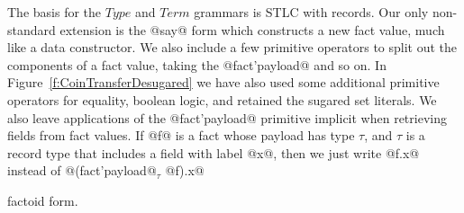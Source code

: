 The basis for the $Type$ and $Term$ grammars is STLC with records. Our only non-standard extension is the @say@ form which constructs a new fact value, much like a data constructor. We also include a few primitive operators to split out the components of a fact value, taking the @fact'payload@ and so on. In Figure~\ref{f:CoinTransferDesugared} we have also used some additional primitive operators for equality, boolean logic, and retained the sugared set literals. We also leave applications of the @fact'payload@ primitive implicit when retrieving fields from fact values. If @f@ is a fact whose payload has type $\tau$, and $\tau$ is a record type that includes a field with label @x@, then we just write @f.x@ instead of @(fact'payload@$_\tau$ @f).x@

 factoid form.


